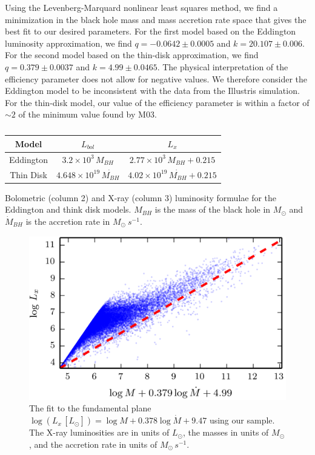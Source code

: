 Using the Levenberg-Marquard nonlinear least squares method, we find
a minimization in the black hole mass and mass accretion rate space
that gives the best fit to our desired parameters. For the first model
based on the Eddington luminosity approximation, we find $q=-0.0642\pm0.0005$
and $k=20.107\pm0.006$. For the second model based on the thin-disk
approximation, we find $q=0.379\pm0.0037$ and $k=4.99\pm0.0465$.
The physical interpretation of the efficiency parameter does not allow
for negative values. We therefore consider the Eddington model to
be inconsistent with the data from the Illustris simulation. For the
thin-disk model, our value of the efficiency parameter is within a
factor of $\sim2$ of the minimum value found by M03.
\begin{table}
\centering{}\protect\caption{\label{tab:luminosityConversions}}
\begin{tabular}{ccc}
\toprule 
Model & $L_{bol}$ & $L_{x}$\tabularnewline
\midrule
\midrule 
Eddington & $3.2\times10^{3}\, M_{BH}$ & $2.77\times10^{3}\, M_{BH}+0.215$\tabularnewline
\midrule 
Thin Disk & $4.648\times10^{19}\,\dot{M_{BH}}$ & $4.02\times10^{19}\,\dot{M_{BH}}+0.215$\tabularnewline
\bottomrule
\end{tabular}Bolometric (column 2) and X-ray (column 3) luminosity formulae for
the Eddington and think disk models. $M_{BH}$ is the mass of the
black hole in $M_{\odot}$ and $\dot{M}_{BH}$ is the accretion rate
in $M_{\odot}\: s^{-1}$.
\end{table}
\begin{figure}
\centering{}\includegraphics{Figures/fp_fit} \protect\caption{\label{fig:q_nr_hist}The fit to the fundamental plane $\log\left(L_{x}\,[L_{\odot}]\right)=\log M+0.378\log\dot{{M}}+9.47$
using our sample. The X-ray luminosities are in units of $L_{\odot}$,
the masses in units of $M_{\odot}$, and the accretion rate in units
of $M_{\odot}\, s^{-1}$.}
\end{figure}
